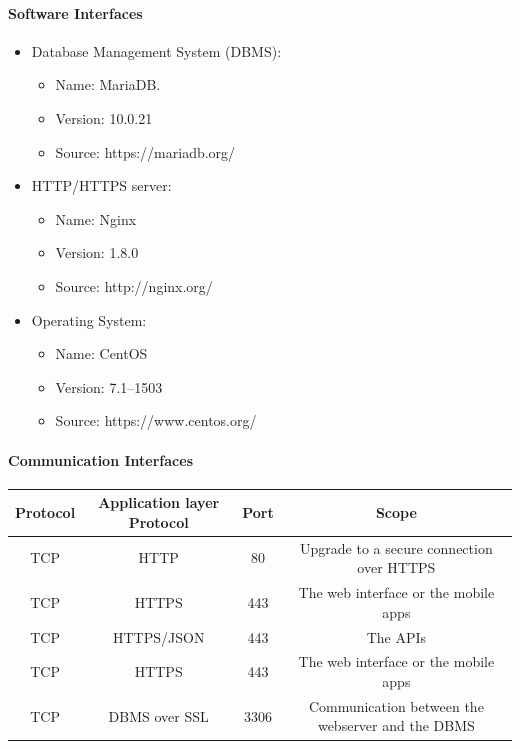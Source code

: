 \documentclass{article}
\begin{document}
\paragraph{Software Interfaces}
\begin{itemize}
	\item Database Management System (DBMS):
		\begin{itemize}
			\item Name: MariaDB.\@
			\item Version: 10.0.21
			\item Source: https://mariadb.org/
		\end{itemize}
	\item HTTP/HTTPS server:
		\begin{itemize}
			\item Name: Nginx
			\item Version: 1.8.0 
			\item Source: http://nginx.org/
		\end{itemize}
	\item Operating System: %
		\begin{itemize}
			\item Name: CentOS
			\item Version: 7.1--1503 
			\item Source: https://www.centos.org/ 
		\end{itemize}
\end{itemize}
\paragraph{Communication Interfaces}
\begin{center}
	\begin{tabular}{*{4}{c}}
	\toprule
    Protocol & Application layer Protocol & Port & Scope \\
	\midrule
	TCP & HTTP & 80 & Upgrade to a secure connection over HTTPS \\ 
    TCP & HTTPS & 443 & The web interface or the mobile apps \\ 
    TCP & HTTPS/JSON & 443 & The APIs \\ 
    TCP & HTTPS & 443 & The web interface or the mobile apps \\ 
    TCP & DBMS over SSL & 3306 & Communication between the webserver and the DBMS \\ 
    \bottomrule
    \end{tabular}
\end{center}
\end{document}
